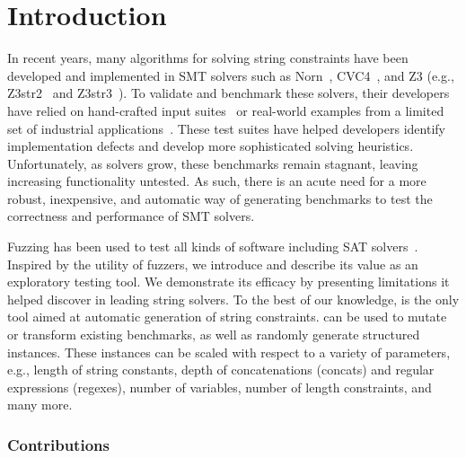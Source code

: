 \section{Introduction}

In recent years, many algorithms for solving string constraints have
been developed and implemented in SMT solvers such as Norn~\cite{norn},
CVC4~\cite{cvc4}, and Z3 (e.g., Z3str2~\cite{z3str2} and Z3str3~\cite{z3str3}).
To validate and benchmark these solvers, their developers have relied on
hand-crafted input suites~\cite{cvc4-tests,z3str3-tests,z3str2-tests} or
real-world examples from a limited set of industrial
applications~\cite{kaluza,kausler}. These test suites have helped
developers identify implementation defects and develop more
sophisticated solving heuristics. Unfortunately, as solvers grow,
these benchmarks remain stagnant, leaving increasing functionality untested.
As such, there is an acute need for a more robust, inexpensive, and automatic way
of generating benchmarks to test
the correctness and performance of SMT solvers.

Fuzzing has been used to test all kinds of software
including SAT solvers~\cite{fuzzsat}. Inspired by the utility of fuzzers,
we introduce \fuzzer{} and describe its value
as an exploratory testing tool. We demonstrate its efficacy
by presenting limitations it helped discover in
leading string solvers. To the best of our knowledge, \fuzzer{} is the
only tool aimed at automatic generation of string constraints. \fuzzer{} can
be used to mutate or transform existing benchmarks, as well as
randomly generate structured instances. These instances can be scaled with
respect to a variety of parameters, e.g., length of string constants,
depth of concatenations (concats) and regular expressions (regexes),
number of variables, number of length constraints, and many more.

\subsubsection{Contributions}

